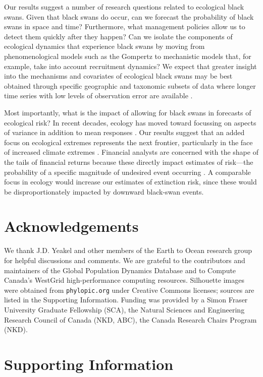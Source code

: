 Our results suggest a number of research questions related to ecological black
swans. Given that black swans do occur, can we forecast the probability of
black swans in space and time? Furthermore, what management policies allow us
to detect them quickly after they happen? Can we isolate the components of
ecological dynamics that experience black swans by moving from
phenomenological models such as the Gompertz to mechanistic models that, for
example, take into account recruitment dynamics? We expect that greater
insight into the mechanisms and covariates of ecological black swans may be
best obtained through specific geographic and taxonomic subsets of data where
longer time series with low levels of observation error are available
\citep[e.g.][]{segura2013}.

Most importantly, what is the impact of allowing for black swans in forecasts
of ecological risk? In recent decades, ecology has moved toward focussing on
aspects of variance in addition to mean responses \citep[e.g.][]{loreau2010a,
  thompson2013}. Our results suggest that an added focus on ecological
extremes represents the next frontier, particularly in the face of increased
climate extremes \citep{meehl2004,thompson2013,ipcc2012}. Financial analysts
are concerned with the shape of the tails of financial returns because these
directly impact estimates of risk---the probability of a specific magnitude of
undesired event occurring \citep{rachev2008}. A comparable focus in ecology
would increase our estimates of extinction risk, since these would be
disproportionately impacted by downward black-swan events.

\section{Acknowledgements}

We thank J.D. Yeakel and other members of the Earth to Ocean research
group for helpful discussions and comments. We are grateful to the
contributors and maintainers of the Global Population Dynamics Database and to
Compute Canada's WestGrid high-performance computing resources. Silhouette
images were obtained from \texttt{phylopic.org} under Creative Commons
licenses; sources are listed in the Supporting Information. Funding was
provided by a Simon Fraser University Graduate Fellowship (SCA), the Natural
Sciences and Engineering Research Council of Canada (NKD, ABC), the Canada
Research Chairs Program (NKD).

\section{Supporting Information}

